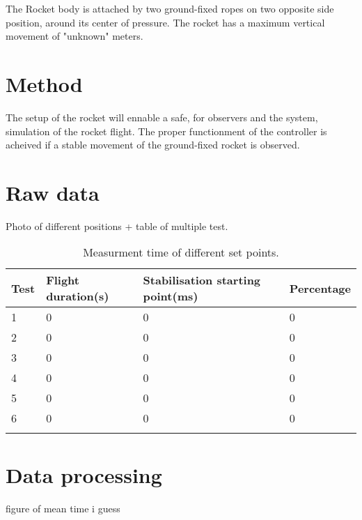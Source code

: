  The Rocket body is attached by two ground-fixed ropes on two opposite side position, around its center of pressure. The rocket has a maximum vertical movement of "unknown" meters.




	\section*{Method}
	
 The setup of the rocket will ennable a safe, for observers and the system, simulation of the rocket flight. The proper functionment of the controller is acheived if a stable movement of the ground-fixed rocket is observed.



	\section*{Raw data}

Photo of different positions + table of multiple test.

\begin{table}[htbp]
	\centering
	\caption{Measurment time of different set points.}
	\label{RPMData}
	\begin{tabular}{llll}
		Test & Flight duration{(}s{)} & Stabilisation starting point{(}ms{)} & Percentage  \\ \hline  \rowcolor{lightGrey}
		1     & 0              & 0             & 0                    \\
		2     & 0              & 0             & 0                    \\  \rowcolor{lightGrey}
		3     & 0              & 0             & 0                    \\ 
		4     & 0             & 0            & 0                    \\  \rowcolor{lightGrey}
		5     & 0             & 0            & 0                    \\
		6     & 0             & 0            & 0                    \\  \rowcolor{lightGrey}              
	\end{tabular}
\end{table}

	\section*{Data processing}

figure of mean time i guess

